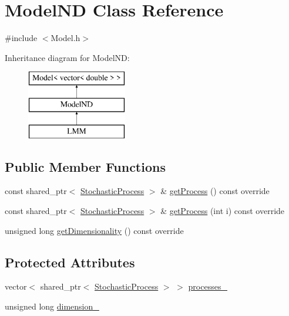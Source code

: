 \hypertarget{class_model_n_d}{}\section{Model\+ND Class Reference}
\label{class_model_n_d}


{\ttfamily \#include $<$Model.\+h$>$}

Inheritance diagram for Model\+ND\+:\begin{figure}[H]
\begin{center}
\leavevmode
\includegraphics[height=3.000000cm]{class_model_n_d}
\end{center}
\end{figure}
\subsection*{Public Member Functions}
\begin{DoxyCompactItemize}
\item 
const shared\+\_\+ptr$<$ \hyperlink{class_stochastic_process}{Stochastic\+Process} $>$ \& \hyperlink{class_model_n_d_ae0965f73049004a6634429b96c9190b8}{get\+Process} () const override
\item 
const shared\+\_\+ptr$<$ \hyperlink{class_stochastic_process}{Stochastic\+Process} $>$ \& \hyperlink{class_model_n_d_acbbc63ae751cb1b3ad6f045fb42b6ac3}{get\+Process} (int i) const override
\item 
unsigned long \hyperlink{class_model_n_d_ab2356536a38f4961257654de629d6093}{get\+Dimensionality} () const override
\end{DoxyCompactItemize}
\subsection*{Protected Attributes}
\begin{DoxyCompactItemize}
\item 
vector$<$ shared\+\_\+ptr$<$ \hyperlink{class_stochastic_process}{Stochastic\+Process} $>$ $>$ \hyperlink{class_model_n_d_ab25eac0a332967200b9d247c9a58572f}{processes\+\_\+}
\item 
unsigned long \hyperlink{class_model_n_d_ac86872437daeeffeb8fb1b387bea28f8}{dimension\+\_\+}
\end{DoxyCompactItemize}


